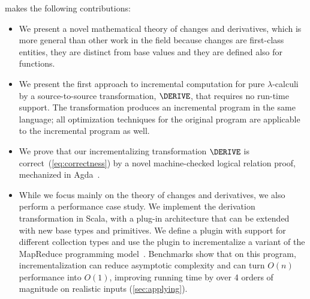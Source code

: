  makes the following contributions:
\begin{itemize}
\item We present a novel mathematical theory of changes and derivatives, which
  is more general than other work in the field because changes are first-class
  entities, they are distinct from base values and they are defined also for
  functions.
%
\item We present the first approach to incremental computation for pure
  $\lambda$-calculi by a source-to-source transformation, $\DERIVE$, that
  requires no run-time support. The transformation produces an incremental
  program in the same language; all optimization techniques for the original
  program are applicable to the incremental program as well.


%
\item We prove that our incrementalizing transformation $\DERIVE$
is correct~(\cref{eq:correctness}) by a novel machine-checked logical relation
proof, mechanized in Agda~\citep{agda-head}.

\item While we focus mainly on the theory of changes
and derivatives, we also perform a performance case study.
We implement the derivation transformation in Scala,
with a plug-in architecture that can be extended with new base
types and primitives. We define a plugin with support for
different collection types and use the plugin to
incrementalize a variant of the MapReduce programming model~\citep{Lammel07}.
  Benchmarks show that on this program,
  incrementalization can reduce asymptotic complexity and can turn $O(n)$
  performance into $O(1)$, improving running time by over 4
  orders of magnitude on realistic inputs (\cref{sec:applying}).
\end{itemize}

